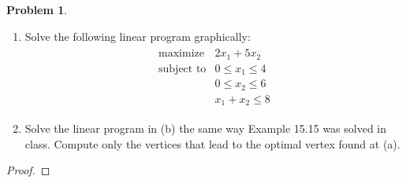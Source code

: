 \documentclass[12pt]{article}
\theoremstyle{definition}
\newtheorem{problem}{Problem}
\begin{document}
\begin{problem}
  \begin{enumerate}
    \item Solve the following linear program graphically:
      \begin{align*}
        \begin{array}{ll}
          \text{maximize} & 2x_1 + 5x_2 \\
          \text{subject to} & 0 \leq x_1 \leq 4 \\
          & 0 \leq x_2 \leq 6 \\
          & x_1 + x_2 \leq 8
        \end{array}
      \end{align*}
    \item Solve the linear program in (b) the same way Example 15.15 was solved in class.
      Compute only the vertices that lead to the optimal vertex found at (a).
  \end{enumerate}
\end{problem}

\begin{proof}
\end{proof}
\end{document}
